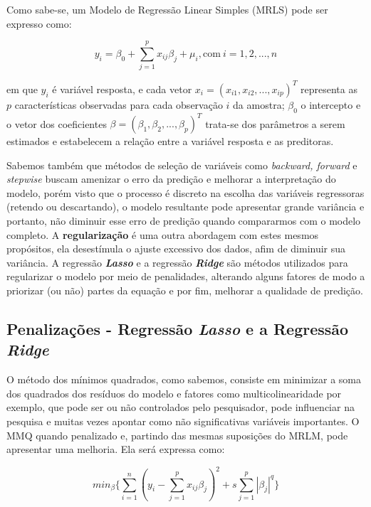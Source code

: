 \documentclass[
  openany]{book}
\begin{document}
Como sabe-se, um Modelo de Regressão Linear Simples (MRLS) pode ser expresso como:

\begin{equation}
    y_i=\beta_0+\displaystyle \sum^p_{j=1}x_{ij}\beta_j+\mu_i, \mbox{com} \ i=1,2,...,n
\end{equation}

em que \(y_i\) é variável resposta, e cada vetor \(x_i=(x_{i1},x_{i2},...,x_{ip})^T\) representa as \(p\) características observadas para cada observação \(i\) da amostra; \(\beta_0\) o intercepto e o vetor dos coeficientes \(\beta=(\beta_1,\beta_2,...,\beta_p)^T\) trata-se dos parâmetros a serem estimados e estabelecem a relação entre a variável resposta e as preditoras.

Sabemos também que métodos de seleção de variáveis como \emph{backward, forward} e \emph{stepwise} buscam amenizar o erro da predição e melhorar a interpretação do modelo, porém visto que o processo é discreto na escolha das variáveis regressoras (retendo ou descartando), o modelo resultante pode apresentar grande variância e portanto, não diminuir esse erro de predição quando compararmos com o modelo completo. A \textbf{regularização} é uma outra abordagem com estes mesmos propósitos, ela desestímula o ajuste excessivo dos dados, afim de diminuir sua variância. A regressão \textbf{\emph{Lasso}} e a regressão \textbf{\emph{Ridge}} são métodos utilizados para regularizar o modelo por meio de penalidades, alterando alguns fatores de modo a priorizar (ou não) partes da equação e por fim, melhorar a qualidade de predição.

\hypertarget{penalizacoes}{%
\subsection{\texorpdfstring{Penalizações - Regressão \emph{Lasso} e a Regressão \emph{Ridge}}{Penalizações - Regressão Lasso e a Regressão Ridge}}\label{penalizacoes}}

O método dos mínimos quadrados, como sabemos, consiste em minimizar a soma dos quadrados dos resíduos do modelo e fatores como multicolinearidade por exemplo, que pode ser ou não controlados pelo pesquisador, pode influenciar na pesquisa e muitas vezes apontar como não significativas variáveis importantes. O MMQ quando penalizado e, partindo das mesmas suposições do MRLM, pode apresentar uma melhoria. Ela será expressa como:

\begin{equation}
    min_\beta \bigg\{\displaystyle \sum^n_{i=1}(y_i-\displaystyle \sum^p_{j=1}x_{ij}\beta_j)^2+s\displaystyle \sum^p_{j=1}|\beta_j|^q\bigg\}
    \label{eq:penalizacao}
\end{equation}
\end{document}
